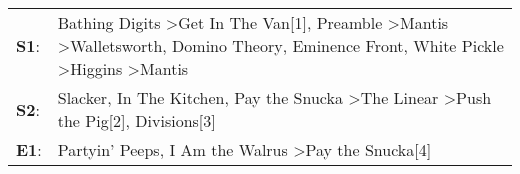 \begin{supertabular}{p{0.03\textwidth}p{0.92\textwidth}}
 \textbf{S1}:  &  Bathing Digits\textsuperscript{} \textgreater \enspace Get In The Van[1]\textsuperscript{}, \enspace Preamble\textsuperscript{} \textgreater \enspace Mantis\textsuperscript{} \textgreater \enspace Walletsworth\textsuperscript{}, \enspace Domino Theory\textsuperscript{}, \enspace Eminence Front\textsuperscript{}, \enspace White Pickle\textsuperscript{} \textgreater \enspace Higgins\textsuperscript{} \textgreater \enspace Mantis\textsuperscript{}  \enspace  \\
 \textbf{S2}:  &                                                                                                                                                                                               Slacker\textsuperscript{}, \enspace In The Kitchen\textsuperscript{}, \enspace Pay the Snucka\textsuperscript{} \textgreater \enspace The Linear\textsuperscript{} \textgreater \enspace Push the Pig[2]\textsuperscript{}, \enspace Divisions[3]\textsuperscript{}  \enspace  \\
 \textbf{E1}:  &                                                                                                                                                                                                                                                                                                                            Partyin' Peeps\textsuperscript{}, \enspace I Am the Walrus\textsuperscript{} \textgreater \enspace Pay the Snucka[4]\textsuperscript{}  \enspace  \\
\end{supertabular}
